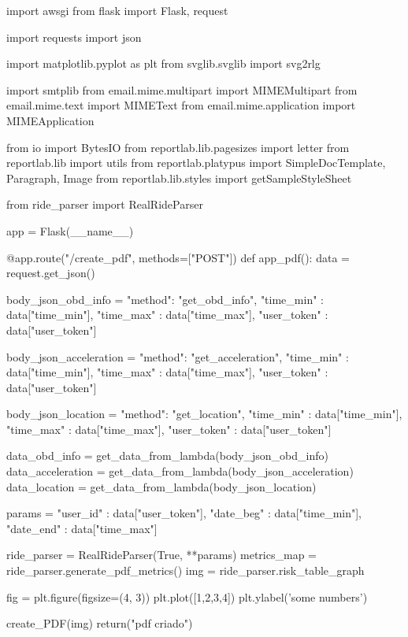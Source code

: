 \begin{python}

import awsgi
from flask import Flask, request

import requests
import json

import matplotlib.pyplot as plt
from svglib.svglib import svg2rlg

import smtplib
from email.mime.multipart import MIMEMultipart
from email.mime.text import MIMEText
from email.mime.application import MIMEApplication

from io import BytesIO
from reportlab.lib.pagesizes import letter
from reportlab.lib import utils
from reportlab.platypus import SimpleDocTemplate, Paragraph, Image
from reportlab.lib.styles import getSampleStyleSheet

from ride_parser import RealRideParser


app = Flask(__name__)

@app.route("/create_pdf", methods=["POST"])
def app_pdf():
    data = request.get_json()

    body_json_obd_info = {
        "method": "get_obd_info",
        "time_min" : data["time_min"],
        "time_max" : data["time_max"],
        "user_token" : data["user_token"]
    }

    body_json_acceleration = {
        "method": "get_acceleration",
        "time_min" : data["time_min"],
        "time_max" : data["time_max"],
        "user_token" : data["user_token"]
    }

    body_json_location = {
        "method": "get_location",
        "time_min" : data["time_min"],
        "time_max" : data["time_max"],
        "user_token" : data["user_token"]
    }

    data_obd_info = get_data_from_lambda(body_json_obd_info)
    data_acceleration = get_data_from_lambda(body_json_acceleration)
    data_location = get_data_from_lambda(body_json_location)


    params = {
        "user_id" : data["user_token"],
        "date_beg" : data["time_min"],
        "date_end" : data["time_max"]
    }

    ride_parser = RealRideParser(True, **params)
    metrics_map = ride_parser.generate_pdf_metrics()
    img = ride_parser.risk_table_graph

    fig = plt.figure(figsize=(4, 3))
    plt.plot([1,2,3,4])
    plt.ylabel('some numbers')

    create_PDF(img)
    return("pdf criado")




\end{python}
